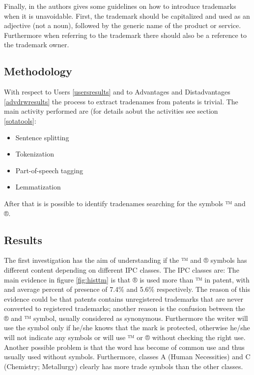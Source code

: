 \documentclass[b5paper,]{book}
\providecommand{\tightlist}{%
  \setlength{\itemsep}{0pt}\setlength{\parskip}{0pt}}
\theoremstyle{definition}
\theoremstyle{definition}
\theoremstyle{definition}
\theoremstyle{remark}
\begin{document}
Finally, in \citep{pressman2018nolo} the authors gives some guidelines
on how to introduce trademarks when it is unavoidable. First, the
trademark should be capitalized and used as an adjective (not a noun),
followed by the generic name of the product or service. Furthermore when
referring to the trademark there should also be a reference to the
trademark owner.

\subsection{Methodology}\label{methodology-1}

With respect to Users \ref{usersresults} and to Advantages and
Distadvantages \ref{advdrwresults} the process to extract tradenames
from patents is trivial. The main activity performed are (for details
aobut the activities see section \ref{sotatools}:

\begin{itemize}
\tightlist
\item
  Sentence splitting
\item
  Tokenization
\item
  Part-of-speech tagging
\item
  Lemmatization
\end{itemize}

After that is is possible to identify tradenames searching for the
symbols ™ and ®.

\subsection{Results}\label{results-2}

The first investigation has the aim of understanding if the ™ and ®
symbols has different content depending on different IPC \citep{wipo1}
classes. The IPC classes are: The main evidence in figure
\ref{fig:histtm} is that ® is used more than ™ in patent, with and
average percent of presence of 7.4\% and 5.6\% respectively. The reason
of this evidence could be that patents contains unregistered trademarks
that are never converted to registered trademarks; another reason is the
confusion between the ® and ™ symbol, usually considered as synonymous.
Furthermore the writer will use the symbol only if he/she knows that the
mark is protected, otherwise he/she will not indicate any symbols or
will use ™ or ® without checking the right use. Another possible problem
is that the word has become of common use and thus usually used without
symbols. Furthermore, classes A (Human Necessities) and C (Chemistry;
Metallurgy) clearly has more trade symbols than the other classes.
\end{document}
